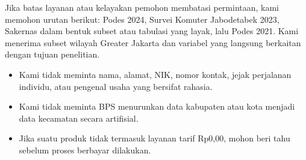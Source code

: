 \documentclass[12pt]{article}
\begin{document}
\vspace{8pt}
Jika batas layanan atau kelayakan pemohon membatasi permintaan, kami memohon urutan berikut: Podes 2024, Survei Komuter Jabodetabek 2023, Sakernas dalam bentuk subset atau tabulasi yang layak, lalu Podes 2021. Kami menerima subset wilayah Greater Jakarta dan variabel yang langsung berkaitan dengan tujuan penelitian.

\begin{itemize}
  \item Kami tidak meminta nama, alamat, NIK, nomor kontak, jejak perjalanan individu, atau pengenal usaha yang bersifat rahasia.
  \item Kami tidak meminta BPS menurunkan data kabupaten atau kota menjadi data kecamatan secara artifisial.
  \item Jika suatu produk tidak termasuk layanan tarif Rp0,00, mohon beri tahu sebelum proses berbayar dilakukan.
\end{itemize}

\LampiranAbstraksi
\end{document}
